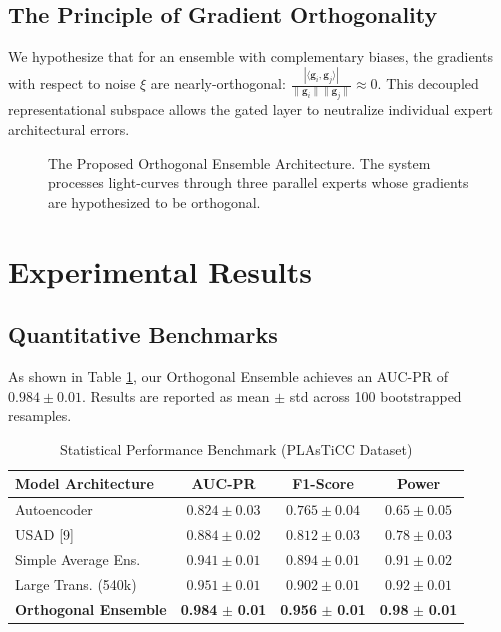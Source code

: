 \documentclass[journal,twoside,web]{IEEEtran}
\begin{document}
\subsection{The Principle of Gradient Orthogonality}
We hypothesize that for an ensemble with complementary biases, the gradients with respect to noise $\xi$ are nearly-orthogonal: $\frac{|\langle \mathbf{g}_i, \mathbf{g}_j \rangle|}{\|\mathbf{g}_i\| \|\mathbf{g}_j\|} \approx 0$. This decoupled representational subspace allows the gated layer to neutralize individual expert architectural errors.

\begin{figure}[t]
\centering

\caption{The Proposed Orthogonal Ensemble Architecture. The system processes light-curves through three parallel experts whose gradients are hypothesized to be orthogonal.}
\label{fig_arch}
\end{figure}

\section{Experimental Results}
\subsection{Quantitative Benchmarks}
As shown in Table \ref{tab_main}, our Orthogonal Ensemble achieves an AUC-PR of $0.984 \pm 0.01$. Results are reported as mean $\pm$ std across 100 bootstrapped resamples.

\begin{table}[htbp]
\caption{Statistical Performance Benchmark (PLAsTiCC Dataset)}
\label{tab_main}
\centering
\begin{tabular}{l c c c}
\toprule
\textbf{Model Architecture} & \textbf{AUC-PR} & \textbf{F1-Score} & \textbf{Power} \\
\midrule
Autoencoder & $0.824 \pm 0.03$ & $0.765 \pm 0.04$ & $0.65 \pm 0.05$ \\
USAD [9] & $0.884 \pm 0.02$ & $0.812 \pm 0.03$ & $0.78 \pm 0.03$ \\
Simple Average Ens. & $0.941 \pm 0.01$ & $0.894 \pm 0.01$ & $0.91 \pm 0.02$ \\
Large Trans. (540k) & $0.951 \pm 0.01$ & $0.902 \pm 0.01$ & $0.92 \pm 0.01$ \\
\textbf{Orthogonal Ensemble} & \textbf{0.984} $\pm$ \textbf{0.01} & \textbf{0.956} $\pm$ \textbf{0.01} & \textbf{0.98} $\pm$ \textbf{0.01} \\
\bottomrule
\end{tabular}
\end{table}
\end{document}
